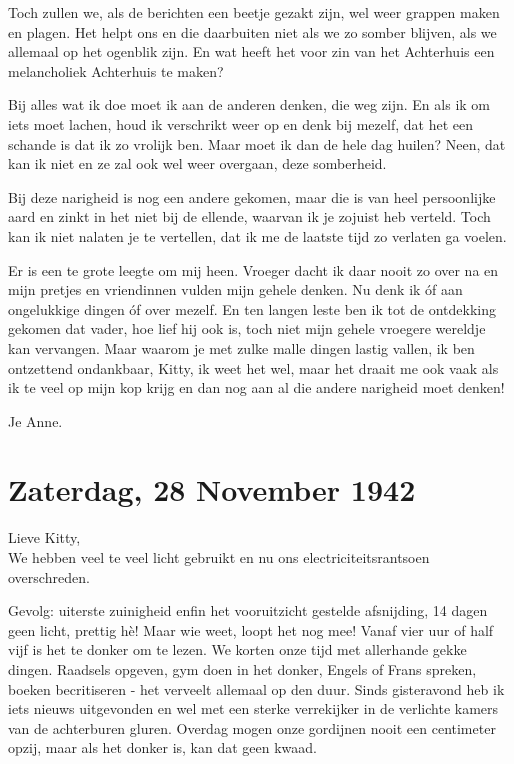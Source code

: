 \documentclass{book}
\begin{document}
Toch zullen we, als de berichten een beetje gezakt zijn, wel weer grappen maken
en plagen. Het helpt ons en die daarbuiten niet als we zo somber blijven, als we
allemaal op het ogenblik zijn. En wat heeft het voor zin van het Achterhuis een
melancholiek Achterhuis te maken?

Bij alles wat ik doe moet ik aan de anderen denken, die weg zijn. En als ik om
iets moet lachen, houd ik verschrikt weer op en denk bij mezelf, dat het een
schande is dat ik zo vrolijk ben. Maar moet ik dan de hele dag huilen? Neen, dat
kan ik niet en ze zal ook wel weer overgaan, deze somberheid.

Bij deze narigheid is nog een andere gekomen, maar die is van heel persoonlijke
aard en zinkt in het niet bij de ellende, waarvan ik je zojuist heb verteld.
Toch kan ik niet nalaten je te vertellen, dat ik me de laatste tijd zo verlaten
ga voelen.

Er is een te grote leegte om mij heen. Vroeger dacht ik daar nooit zo over na en
mijn pretjes en vriendinnen vulden mijn gehele denken. Nu denk ik óf aan
ongelukkige dingen óf over mezelf. En ten langen leste ben ik tot de ontdekking
gekomen dat vader, hoe lief hij ook is, toch niet mijn gehele vroegere wereldje
kan vervangen. Maar waarom je met zulke malle dingen lastig vallen, ik ben
ontzettend ondankbaar, Kitty, ik weet het wel, maar het draait me ook vaak als
ik te veel op mijn kop krijg en dan nog aan al die andere narigheid moet denken!

Je Anne.

\section*{Zaterdag, 28 November 1942}

Lieve Kitty,\\
We hebben veel te veel licht gebruikt en nu ons
electriciteitsrantsoen overschreden.

Gevolg: uiterste zuinigheid enfin het vooruitzicht gestelde afsnijding, 14 dagen
geen licht, prettig hè! Maar wie weet, loopt het nog mee! Vanaf vier uur of half
vijf is het te donker om te lezen. We korten onze tijd met allerhande gekke
dingen. Raadsels opgeven, gym doen in het donker, Engels of Frans spreken,
boeken becritiseren - het verveelt allemaal op den duur. Sinds gisteravond heb
ik iets nieuws uitgevonden en wel met een sterke verrekijker in de verlichte
kamers van de achterburen gluren.  Overdag mogen onze gordijnen nooit een
centimeter opzij, maar als het donker is, kan dat geen kwaad.
\end{document}
